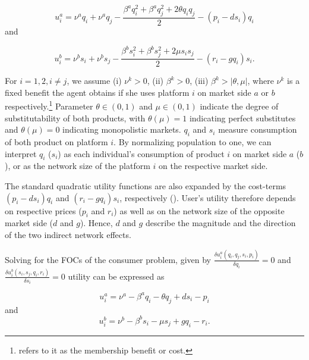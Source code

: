 \documentclass[12pt,a4paper,notitlepage]{article}
\begin{document}
\begin{equation}\label{4.1}
u_i^a = \nu^a q_i + \nu^a q_j-\frac{\beta^a q^2_i+ \beta^a q^2_j+ 2 \theta q_i q_j}{2}-(p_i-d s_i)q_i
\end{equation} and 

\begin{equation}\label{4.2}
u_i^b = \nu^b s_i + \nu^b s_j -\frac{\beta^b s^2_i+ \beta^b s^2_j+2 \mu s_i s_j}{2}-(r_i-g q_i)s_i.
\end{equation}

For $i=1,2, i \neq j$, we assume (i) $\nu^k > 0$, (ii) $\beta^k > 0$, (iii) $\beta^k>\vert\theta,\mu\vert$, where $\nu^k$ is a fixed benefit the agent obtains if she uses platform $i$ on market side $a$ or $b$ respectively.\footnote{\cite{weyl_price_2010} refers to it as the membership benefit or cost.} Parameter $\theta \in (0,1)$ and $\mu \in (0,1)$ indicate the degree of substitutability of both products, with $\theta (\mu) = 1$ indicating perfect substitutes and $\theta (\mu) = 0$ indicating monopolistic markets. $q_i$ and $s_i$ measure consumption of both product on platform $i$. By normalizing  population to one, we can interpret $q_i$ ($s_i$) as each individual’s consumption of product $i$ on market side $a$ ($b$), or as the network size of the platform $i$ on the respective market side.

The standard quadratic utility functions are also expanded by the cost-terms $(p_i-d s_i)q_i$ and $(r_i-g q_i)s_i$, respectively (\cite{kind_business_2009}). User's utility therefore depends on respective prices ($p_i$ and $r_i$) as well as on the network size of the opposite market side ($d$ and $g$). Hence, $d$ and $g$ describe the magnitude and the direction of the two indirect network effects. 

Solving for the FOCs of the consumer problem, given by $\frac{\delta u_i^a(q_i,q_j,s_i,p_i)}{\delta q_i}=0$ and  $\frac{\delta u_i^b(s_i,s_j,q_i,r_i)}{\delta s_i}=0$ utility can be expressed as

\begin{equation}\label{utility_a}
u_i^a = \nu^a-\beta^a q_i - \theta q_j +ds_i - p_i
\end{equation}
and
\begin{equation}\label{utility_b}
u_i^b=\nu^b-\beta^b s_i - \mu s_j +gq_i - r_i.
\end{equation} 
\end{document}
